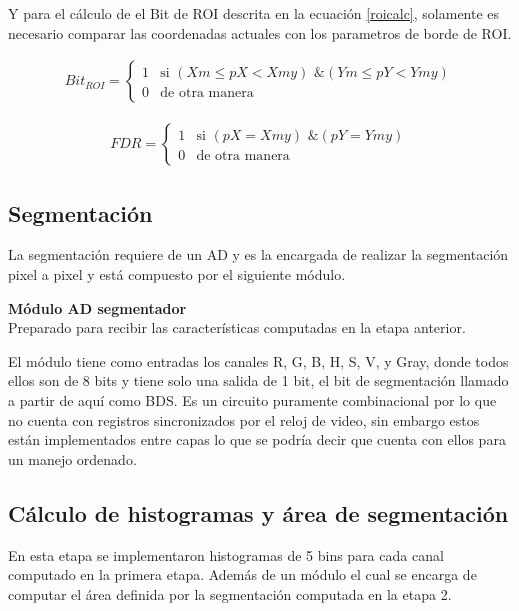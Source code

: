 \documentclass[twoside,spanish,ESP,MSc]{plantillaLabUPV}
\theoremstyle{definition}
\begin{document}
Y para el cálculo de el Bit de ROI descrita en la ecuación \ref{roicalc}, solamente es necesario comparar las coordenadas actuales con los parametros de borde de ROI.

\begin{equation} \label{roicalc}
\begin{gathered} 
Bit_{ROI} = \left \{ \begin{matrix}
				1 & \mbox{si } (Xm \leq pX < Xmy) \mbox{ \& } (Ym \leq pY < Ymy)\\
				0 & \mbox{de otra manera}  
			\end{matrix}\right. 
\end{gathered}
\end{equation}

\begin{equation} \label{roilast}
\begin{gathered} 
FDR = \left \{ \begin{matrix}
1 & \mbox{si } (pX = Xmy) \mbox{ \& } (pY = Ymy)\\
0 & \mbox{de otra manera}  
\end{matrix}\right. 
\end{gathered}
\end{equation}

\subsection{Segmentación}
La segmentación requiere de un AD y es la encargada de realizar la segmentación pixel a pixel y está compuesto por el siguiente módulo.

\checkmark\textbf{Módulo AD segmentador}\\
Preparado para recibir las características computadas en la etapa anterior. 

El módulo tiene como entradas los canales R, G, B, H, S, V, y Gray, donde todos ellos son de 8 bits y tiene solo una salida de 1 bit, el bit de segmentación llamado a partir de aquí como BDS. Es un circuito puramente combinacional por lo que no cuenta con registros sincronizados por el reloj de video, sin embargo estos están implementados entre capas lo que se podría decir que cuenta con ellos para un manejo ordenado.
 

\subsection{Cálculo de histogramas y área de segmentación}
En esta etapa se implementaron histogramas de 5 bins para cada canal computado en la primera etapa. Además de un módulo el cual se encarga de computar el área definida por la segmentación computada en la etapa 2.
\end{document}
